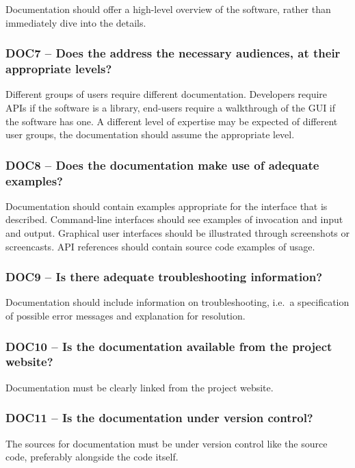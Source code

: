 \documentclass[a4paper,11pt]{article}
\begin{document}
Documentation should offer a high-level overview of the software, rather
than immediately dive into the details.

\subsubsection{DOC7 -- Does the address the necessary audiences, at their appropriate levels?}

Different groups of users require different documentation. Developers require
APIs if the software is a library, end-users require a walkthrough of the GUI
if the software has one. A different level of expertise may be expected of
different user groups, the documentation should assume the appropriate level.

\subsubsection{DOC8 -- Does the documentation make use of adequate examples?}

Documentation should contain examples appropriate for the interface that is
described. Command-line interfaces should see examples of invocation and input
and output. Graphical user interfaces should be illustrated through screenshots or
screencasts. API references should contain source code examples of usage.

\subsubsection{DOC9 -- Is there adequate troubleshooting information?}

Documentation should include information on troubleshooting, i.e.\ a
specification of possible error messages and explanation for resolution.

\subsubsection{DOC10 -- Is the documentation available from the project website?}

Documentation must be clearly linked from the project website.

\subsubsection{DOC11 -- Is the documentation under version control?}

The sources for documentation must be under version control like the source
code, preferably alongside the code itself.
\end{document}
